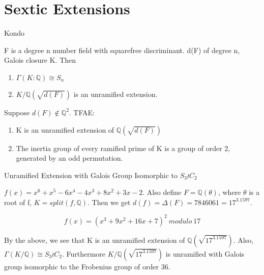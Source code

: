 \documentclass[10pt]{beamer}
\theoremstyle{plain} %
\begin{document}
\section{Sextic Extensions}
\begin{frame}{Kondo}
\pause

    \begin{theorem}
   F is a degree n number field with squarefree discriminant.  d(F) of degree n, Galois closure K. Then \begin{enumerate}
        \item $\Gamma(K:\mathbb{Q})\cong S_n$
        \item $K/\mathbb{Q}(\sqrt{d(F)})$ is an unramified extension.
    \end{enumerate}
\end{theorem}
\pause

\begin{lemma}
Suppose $d(F)\notin \mathbb{Q}^2$. TFAE:
\begin{enumerate}
    \item K is an unramified extension of $\mathbb{Q}(\sqrt{d(F)})$
    \item The inertia group of every ramified prime of K is a group of order 2, generated by an odd permutation. 
\end{enumerate}
\end{lemma} 
\end{frame}
\begin{frame}{Unramified Extension with Galois Group Isomorphic to $ S_3 \wr C_2$}
\pause

\begin{example}
 $f(x)=x^6 + x^5 - 6x^4 - 4x^3 + 8x^2 + 3x - 2$. Also define $F=\mathbb{Q}(\theta)$, where $\theta$ is a root of f, $K=split(f,\mathbb{Q})$. Then we get $d(f)=\Delta(F)=7846061=17^3.1597$. \pause

\begin{equation}
   f(x)= (x^3 + 9x^2 + 16x + 7)^2\:modulo\:17
\end{equation}
\pause

By the above, we see that K is an unramified extension of $\mathbb{Q}(\sqrt{17^3.1597})$. Also, $\Gamma(K/\mathbb{Q})\cong S_3 \wr C_2$. Furthermore $K/\mathbb{Q}(\sqrt{17^3.1597})$ is unramified with Galois group isomorphic to the Frobenius group of order 36.
\end{example}    
\end{frame}
\end{document}
